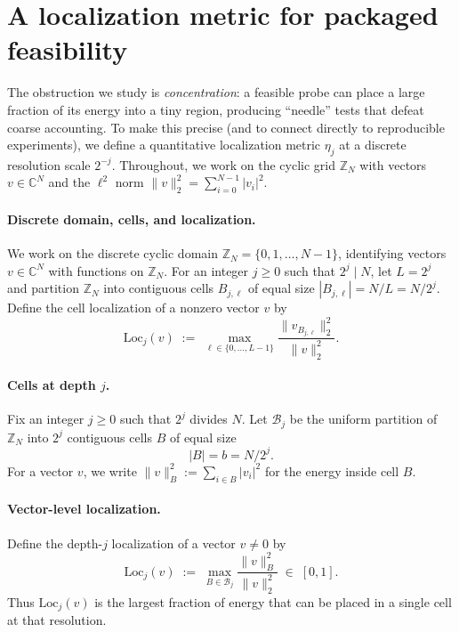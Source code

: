 \documentclass[11pt]{article}
\theoremstyle{plain}
\theoremstyle{definition}
\theoremstyle{remark}
\newcommand{\C}{\mathbb{C}}
\begin{document}
 \section{A localization metric for packaged feasibility}\label{sec:eta-metric}

The obstruction we study is \emph{concentration}: a feasible probe can place a large fraction of its energy into a tiny region, producing ``needle'' tests that defeat coarse accounting.
To make this precise (and to connect directly to reproducible experiments), we define a quantitative localization metric \(\eta_j\) at a discrete resolution scale \(2^{-j}\).
Throughout, we work on the cyclic grid \(\mathbb{Z}_N\) with vectors \(v \in \C^N\) and the \(\ell^2\) norm \(\|v\|_2^2 = \sum_{i=0}^{N-1} |v_i|^2\).

\paragraph{Discrete domain, cells, and localization.}
We work on the discrete cyclic domain \(\mathbb{Z}_N=\{0,1,\dots,N-1\}\), identifying vectors \(v\in\mathbb{C}^N\) with functions on \(\mathbb{Z}_N\).
For an integer \(j\ge 0\) such that \(2^j\mid N\), let \(L=2^j\) and partition \(\mathbb{Z}_N\) into contiguous cells \(B_{j,\ell}\) of equal size \(|B_{j,\ell}|=N/L=N/2^j\).
Define the cell localization of a nonzero vector \(v\) by
\[
\mathrm{Loc}_j(v)\;:=\;\max_{\ell\in\{0,\dots,L-1\}}\frac{\|v_{B_{j,\ell}}\|_2^2}{\|v\|_2^2}.
\]

\paragraph{Cells at depth \(j\).}
Fix an integer \(j \ge 0\) such that \(2^j\) divides \(N\).
Let \(\mathcal{B}_j\) be the uniform partition of \(\mathbb{Z}_N\) into \(2^j\) contiguous cells \(B\) of equal size
\[
|B| = b = N/2^j .
\]
For a vector \(v\), we write \(\|v\|_B^2 := \sum_{i \in B} |v_i|^2\) for the energy inside cell \(B\).

\paragraph{Vector-level localization.}
Define the depth-\(j\) localization of a vector \(v \neq 0\) by
\begin{equation}\label{eq:Locj}
\mathrm{Loc}_j(v) \;:=\; \max_{B \in \mathcal{B}_j} \frac{\|v\|_B^2}{\|v\|_2^2}
\;\in\; [0,1].
\end{equation}
Thus \(\mathrm{Loc}_j(v)\) is the largest fraction of energy that can be placed in a single cell at that resolution.
\end{document}
